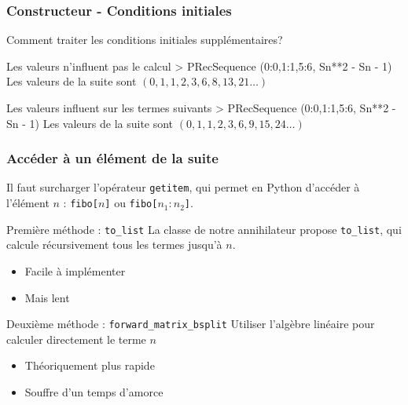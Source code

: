 \documentclass{beamer}
\newlength{\charwidth}
\newcommand{\uline}{\underline{\hspace{2\charwidth}}}
\newenvironment{repl}
 {\VerbatimEnvironment
  \let\FancyVerbFormatLine\shellformatline
  \Verbatim}
 {\endVerbatim}
\begin{document}

\begin{frame}[fragile]
\frametitle{Constructeur - Conditions initiales}
\begin{center}
{\large Comment traiter les conditions initiales supplémentaires?}
\begin{block}{Les valeurs n'influent pas le calcul}
    \begin{repl}
> PRecSequence ({0:0,1:1,5:6}, Sn**2 - Sn - 1)
    \end{repl}
    Les valeurs de la suite sont $(0,1,1,2,3,6,8,13,21\ldots)$
\end{block}
\begin{block}{Les valeurs influent sur les termes suivants}
    \begin{repl}
> PRecSequence ({0:0,1:1,5:6}, Sn**2 - Sn - 1)
    \end{repl}
    Les valeurs de la suite sont $(0,1,1,2,3,6,9,15,24\ldots)$
\end{block}
\end{center}
\end{frame}


\begin{frame}
\frametitle{Accéder à un élément de la suite}
\begin{center}
Il faut surcharger l'opérateur \texttt{\uline getitem\uline}, qui permet en Python
d'accéder à l'élément $n$ : \texttt{fibo[$n$]} ou \texttt{fibo[$n_1:n_2$]}.
\begin{block}{Première méthode : \texttt{to\_list}}
    La classe de notre annihilateur propose \texttt{to\_list}, qui calcule récursivement tous
    les termes jusqu'à $n$.
    \begin{itemize}
        \item Facile à implémenter
        \item Mais lent
    \end{itemize}
\end{block}
\begin{block}{Deuxième méthode : \texttt{forward\_matrix\_bsplit}}
    Utiliser l'algèbre linéaire pour calculer directement le terme $n$
    \begin{itemize}
        \item Théoriquement plus rapide
        \item Souffre d'un temps d'amorce
    \end{itemize}
\end{block}
\end{center}
\end{frame}
\end{document}
